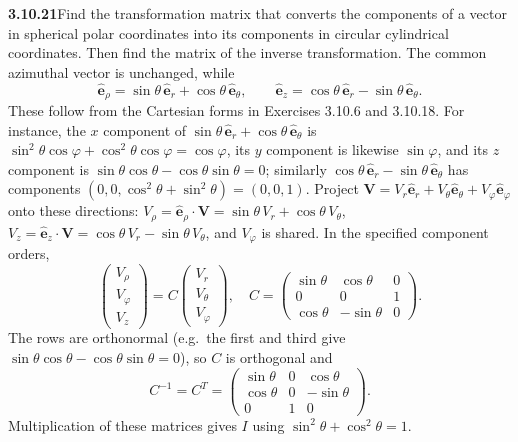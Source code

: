 \par\bigskip
\noindent\textbf{3.10.21}\quad Find the transformation matrix that converts
the components of a vector in spherical polar coordinates into its components
in circular cylindrical coordinates. Then find the matrix of the inverse
transformation.
\solution
The common azimuthal vector is unchanged, while
\[
\hat{\mathbf e}_\rho=\sin\theta\,\hat{\mathbf e}_r+
\cos\theta\,\hat{\mathbf e}_\theta,\qquad
\hat{\mathbf e}_z=\cos\theta\,\hat{\mathbf e}_r-
\sin\theta\,\hat{\mathbf e}_\theta.
\]
These follow from the Cartesian forms in Exercises 3.10.6 and 3.10.18.
For instance, the $x$ component of
$\sin\theta\,\hat{\mathbf e}_r+\cos\theta\,\hat{\mathbf e}_\theta$ is
$\sin^2\theta\cos\varphi+\cos^2\theta\cos\varphi=\cos\varphi$, its
$y$ component is likewise $\sin\varphi$, and its $z$ component is
$\sin\theta\cos\theta-\cos\theta\sin\theta=0$; similarly
$\cos\theta\,\hat{\mathbf e}_r-\sin\theta\,\hat{\mathbf e}_\theta$ has
components $(0,0,\cos^2\theta+\sin^2\theta)=(0,0,1)$.
Project $\mathbf V=V_r\hat{\mathbf e}_r+V_\theta\hat{\mathbf e}_\theta
+V_\varphi\hat{\mathbf e}_\varphi$ onto these directions:
$V_\rho=\hat{\mathbf e}_\rho\cdot\mathbf V=\sin\theta\,V_r+\cos\theta\,V_\theta$,
$V_z=\hat{\mathbf e}_z\cdot\mathbf V=\cos\theta\,V_r-\sin\theta\,V_\theta$,
and $V_\varphi$ is shared. In the specified component
orders,
\[
\boxed{\begin{pmatrix}V_\rho\\V_\varphi\\V_z\end{pmatrix}
=C\begin{pmatrix}V_r\\V_\theta\\V_\varphi\end{pmatrix},\quad
C=\begin{pmatrix}\sin\theta&\cos\theta&0\\0&0&1\\
\cos\theta&-\sin\theta&0\end{pmatrix}}.
\]
The rows are orthonormal (e.g.\ the first and third give
$\sin\theta\cos\theta-\cos\theta\sin\theta=0$), so $C$ is orthogonal and
\[
\boxed{C^{-1}=C^T=
\begin{pmatrix}\sin\theta&0&\cos\theta\\
\cos\theta&0&-\sin\theta\\0&1&0\end{pmatrix}}.
\]
Multiplication of these matrices gives $I$ using $\sin^2\theta+\cos^2\theta=1$.

